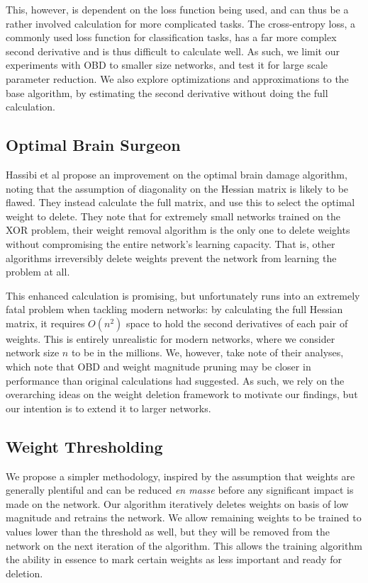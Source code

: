 \documentclass[10pt,twocolumn,letterpaper]{article}
\begin{document}
This, however, is dependent on the loss function being used, and can thus be a rather involved calculation for more complicated tasks.
The cross-entropy loss, a commonly used loss function for classification tasks, has a far more complex second derivative and is thus difficult to calculate well.
As such, we limit our experiments with OBD to smaller size networks, and test it for large scale parameter reduction.
We also explore optimizations and approximations to the base algorithm, by estimating the second derivative without doing the full calculation.

\subsection{Optimal Brain Surgeon}
Hassibi et al \cite{hassibi1993optimal, hassibi1994optimal} propose an improvement on the optimal brain damage algorithm, noting that the assumption of diagonality on the Hessian matrix is likely to be flawed.
They instead calculate the full matrix, and use this to select the optimal weight to delete.
They note that for extremely small networks trained on the XOR problem, their weight removal algorithm is the only one to delete weights without compromising the entire network's learning capacity.
That is, other algorithms irreversibly delete weights prevent the network from learning the problem at all.

This enhanced calculation is promising, but unfortunately runs into an extremely fatal problem when tackling modern networks: by calculating the full Hessian matrix, it requires $O(n^2)$ space to hold the second derivatives of each pair of weights.
This is entirely unrealistic for modern networks, where we consider network size $n$ to be in the millions.
We, however, take note of their analyses, which note that OBD and weight magnitude pruning may be closer in performance than original calculations had suggested.
As such, we rely on the overarching ideas on the weight deletion framework to motivate our findings, but our intention is to extend it to larger networks.
\subsection{Weight Thresholding}
We propose a simpler methodology, inspired by the assumption that weights are generally plentiful and can be reduced \emph{en masse} before any significant impact is made on the network.
Our algorithm iteratively deletes weights on basis of low magnitude and retrains the network.
We allow remaining weights to be trained to values lower than the threshold as well, but they will be removed from the network on the next iteration of the algorithm.
This allows the training algorithm the ability in essence to mark certain weights as less important and ready for deletion.
\end{document}
